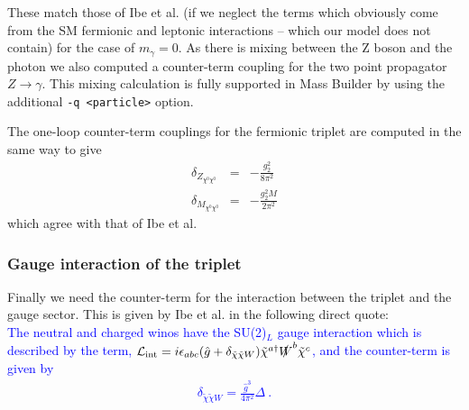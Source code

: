 \documentclass[11pt]{article}
\newcommand{\mb}{\textsf{Mass Builder} \! }
\begin{document}
These match those of Ibe et al. (if we neglect the terms which obviously come from the SM fermionic and leptonic interactions -- which our model does not contain) for the case of $m_{\gamma}=0$.  As there is mixing between the Z boson and the photon we also computed a counter-term coupling for the two point propagator $Z\rightarrow\gamma$.  This mixing calculation is fully supported in \mb by using the additional \lstinline{-q <particle>} option.

The one-loop counter-term couplings for the fermionic triplet are computed in the same way to give
\begin{eqnarray}
\delta_{Z_{\chi^0\chi^0}} &=&-\frac{g_2^2}{8 \pi^2}\\
\delta_{M_{\chi^0\chi^0}} &=&-\frac{g_2^2 M}{2 \pi^2}
\end{eqnarray}
which agree with that of Ibe et al.


\subsubsection{Gauge interaction of the triplet}

Finally we need the counter-term for the interaction between the triplet and the gauge sector.  This is given by Ibe et al. in the following direct quote:\\

\textcolor{blue}{
The neutral and charged winos have the SU(2)$_L$ gauge interaction which is described by the term, ${\cal L}_{\rm int} = i\epsilon_{abc}(\hat{g} + \delta_{\tilde{\chi} \tilde{\chi} W}) \tilde{\chi}^{a \dagger} \slashed{W}^b \tilde{\chi}^c$, and the counter-term is given by
\begin{eqnarray}
\delta_{\tilde{\chi} \tilde{\chi} W} = \frac{\hat{g}^3}{4\pi^2} \Delta\ .
\end{eqnarray}
}
\end{document}
